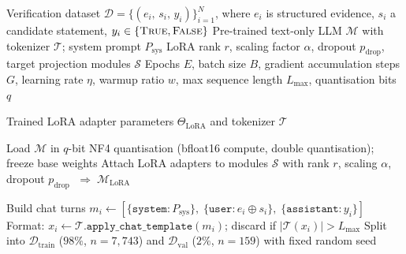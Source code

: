 \documentclass[12pt]{article}
\begin{document}
\setcounter{algorithm}{0}

\begin{algorithm}[H]
\small
\caption{Supervised Fine-tuning of a Text-only LoRA Verifier}
\begin{algorithmic}[1]

\Require Verification dataset $\mathcal{D} = \{(e_i,\, s_i,\, y_i)\}_{i=1}^{N}$, where $e_i$ is structured evidence, $s_i$ a candidate statement, $y_i \in \{\textsc{True},\textsc{False}\}$
\Require Pre-trained text-only LLM $\mathcal{M}$ with tokenizer $\mathcal{T}$; system prompt $P_{\text{sys}}$
\Require LoRA rank $r$, scaling factor $\alpha$, dropout $p_{\text{drop}}$, target projection modules $\mathcal{S}$
\Require Epochs $E$, batch size $B$, gradient accumulation steps $G$, learning rate $\eta$, warmup ratio $w$, max sequence length $L_{\max}$, quantisation bits $q$

\Ensure Trained LoRA adapter parameters $\Theta_{\text{LoRA}}$ and tokenizer $\mathcal{T}$

\State Load $\mathcal{M}$ in $q$-bit NF4 quantisation (bfloat16 compute, double quantisation); freeze base weights
\State Attach LoRA adapters to modules $\mathcal{S}$ with rank $r$, scaling $\alpha$, dropout $p_{\text{drop}}$ $\;\Rightarrow\;\mathcal{M}_{\text{LoRA}}$

    \State Build chat turns $m_i \gets [\{\texttt{system}: P_{\text{sys}}\},\;\{\texttt{user}: e_i \oplus s_i\},\;\{\texttt{assistant}: y_i\}]$
    \State Format: $x_i \gets \mathcal{T}.\texttt{apply\_chat\_template}(m_i)$; discard if $|\mathcal{T}(x_i)| > L_{\max}$
\EndFor
\State Split into $\mathcal{D}_{\text{train}}$ ($98\%$, $n=7{,}743$) and $\mathcal{D}_{\text{val}}$ ($2\%$, $n=159$) with fixed random seed


\end{algorithmic}
\end{algorithm}
\end{document}
